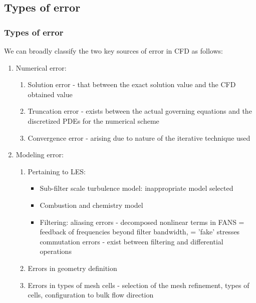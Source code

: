 \documentclass{beamer}
\begin{document}
\subsection{Types of error}
\begin{frame}%
\frametitle{Types of error}
\scriptsize
We can broadly classify the two key sources of error in CFD as follows:

\begin{enumerate}
\item Numerical error:
	\begin{enumerate}[a]
	\scriptsize
	\item Solution error - that between the exact solution value and the CFD obtained value
	\item Truncation error - exists between the actual governing equations and the discretized PDEs for the numerical scheme
	\item Convergence error - arising due to nature of the iterative technique used
	\end{enumerate}
\item Modeling error:
	\begin{enumerate}[a]
	\scriptsize
	\item Pertaining to LES:
		\begin{itemize}
		\tiny
		\item Sub-filter scale turbulence model: inappropriate model selected
		\item Combustion and chemistry model
		\item Filtering:\newline
			  aliasing errors - decomposed nonlinear terms in FANS = feedback of frequencies beyond filter bandwidth, = 'fake' stresses \newline
			 commutation errors - exist between filtering and differential operations 
		\end{itemize}
	\item Errors in geometry definition 
	\item Errors in types of mesh cells - selection of the mesh refinement, types of cells, configuration to bulk flow direction
	\end{enumerate}
\end{enumerate}

\end{frame}





\end{document}
